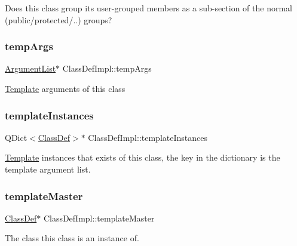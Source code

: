 Does this class group its user-\/grouped members as a sub-\/section of the normal (public/protected/..) groups? \mbox{\label{class_class_def_impl_aacfd7b41980ab90e43e015ca2583a56c}} 
\subsubsection{\texorpdfstring{tempArgs}{tempArgs}}
{\footnotesize\ttfamily \mbox{\hyperlink{class_argument_list}{Argument\+List}}$\ast$ Class\+Def\+Impl\+::temp\+Args}

\mbox{\hyperlink{class_template}{Template}} arguments of this class \mbox{\label{class_class_def_impl_a40568b5135505092ae7acae3e4ce224f}} 
\subsubsection{\texorpdfstring{templateInstances}{templateInstances}}
{\footnotesize\ttfamily Q\+Dict$<$\mbox{\hyperlink{class_class_def}{Class\+Def}}$>$$\ast$ Class\+Def\+Impl\+::template\+Instances}

\mbox{\hyperlink{class_template}{Template}} instances that exists of this class, the key in the dictionary is the template argument list. \mbox{\label{class_class_def_impl_a14389d44bce551c00b53391115004d5f}} 
\subsubsection{\texorpdfstring{templateMaster}{templateMaster}}
{\footnotesize\ttfamily \mbox{\hyperlink{class_class_def}{Class\+Def}}$\ast$ Class\+Def\+Impl\+::template\+Master}

The class this class is an instance of. \mbox{\label{class_class_def_impl_af0266bc567e2d9eed094e5ced846ddac}} 

